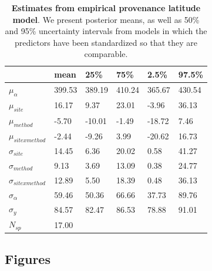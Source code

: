 \documentclass{article}\usepackage[]{graphicx}\usepackage[]{color}
\begin{document}
\begin{table}[ht]
\centering
\caption{\textbf{Estimates from empirical provenance latitude model}. We present posterior means, as well as 50\% and 95\% uncertainty intervals from models in which the predictors have been standardized so that they are comparable.} 
\label{tab:provreal}
\begingroup\footnotesize
\begin{tabular}{|p{}|p{}p{}p{}p{}p{}|}
  \hline
 & mean & 25\% & 75\% & 2.5\% & 97.5\% \\ 
  \hline
$\mu_{\alpha}$ & 399.53 & 389.19 & 410.24 & 365.67 & 430.54 \\ 
  $\mu_{site}$ & 16.17 & 9.37 & 23.01 & -3.96 & 36.13 \\ 
  $\mu_{method}$ & -5.70 & -10.01 & -1.49 & -18.72 & 7.46 \\ 
  $\mu_{sitexmethod}$ & -2.44 & -9.26 & 3.99 & -20.62 & 16.73 \\ 
  $\sigma_{site}$ & 14.45 & 6.36 & 20.02 & 0.58 & 41.27 \\ 
  $\sigma_{method}$ & 9.13 & 3.69 & 13.09 & 0.38 & 24.77 \\ 
  $\sigma_{sitexmethod}$ & 12.89 & 5.50 & 18.39 & 0.48 & 36.13 \\ 
  $\sigma_{\alpha}$ & 59.46 & 50.36 & 66.66 & 37.73 & 89.76 \\ 
  $\sigma_{y}$ & 84.57 & 82.47 & 86.53 & 78.88 & 91.01 \\ 
   \hline
$N_{sp}$ & 17.00 &  &  &  &  \\ 
   \hline
\end{tabular}
\endgroup
\end{table}


\clearpage
\subsection*{Figures}

  
\end{document}
